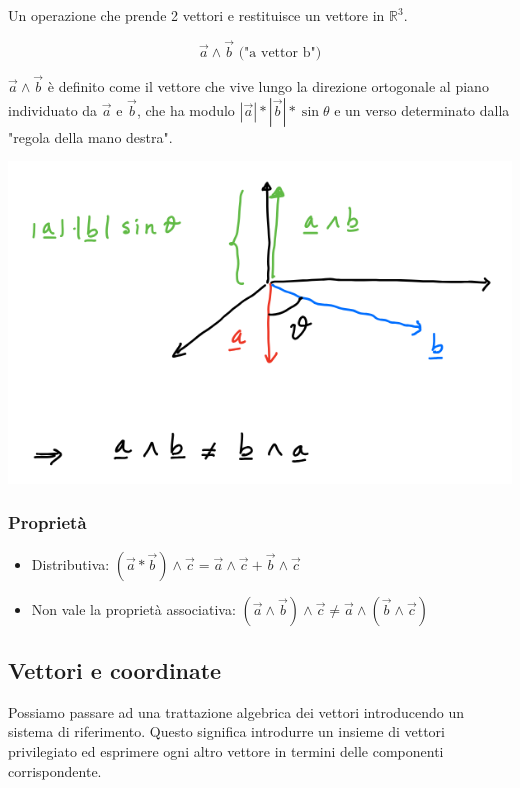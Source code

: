 \documentclass{subfiles}
\begin{document}
Un operazione che prende 2 vettori e restituisce un vettore in $\mathbb{R}^3$.

$$
\vec{a} \wedge \vec{b} \text{ ("a vettor b")}
$$

\noindent
$\vec{a} \wedge \vec{b}$ è definito come il vettore che vive lungo la direzione ortogonale al piano individuato da $\vec{a}$ e $\vec{b}$, che ha modulo $|\vec{a}|*|\vec{b}|*\sin{\theta}$ e un verso determinato dalla "regola della mano destra".

\includegraphics[width=\columnwidth]{prodotto-vettoriale}

\subsubsection{Proprietà}

\begin{itemize}
    \item Distributiva: $(\vec{a} * \vec{b}) \wedge \vec{c} = \vec{a} \wedge \vec{c} + \vec{b} \wedge \vec{c}$
    \item Non vale la proprietà associativa: $(\vec{a} \wedge \vec{b}) \wedge \vec{c} \neq \vec{a} \wedge (\vec{b} \wedge \vec{c})$
\end{itemize}

\subsection{Vettori e coordinate}

Possiamo passare ad una trattazione algebrica dei vettori introducendo un sistema di riferimento.
Questo significa introdurre un insieme di vettori privilegiato ed esprimere ogni altro vettore in termini delle componenti corrispondente.
\end{document}
